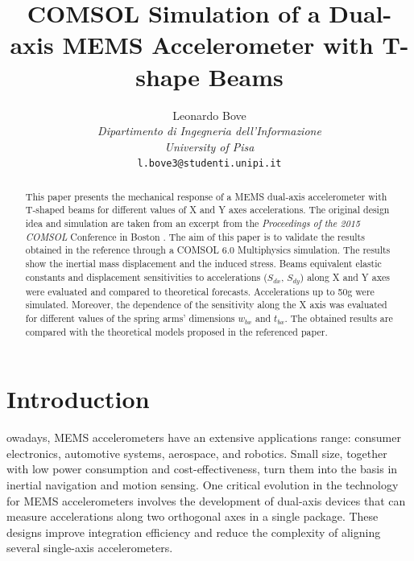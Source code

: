 \documentclass[lettersize,journal]{IEEEtran}
\begin{document}
	
    \title{COMSOL Simulation of a Dual-axis MEMS Accelerometer with T-shape Beams}

    \author{Leonardo Bove\\
            \textit{Dipartimento di Ingegneria dell'Informazione}\\
            \textit{University of Pisa}\\
            \texttt{l.bove3@studenti.unipi.it}}

    \maketitle
	
    \begin{abstract}
        This paper presents the mechanical response of a MEMS dual-axis accelerometer with T-shaped beams for different values of X and Y axes accelerations. The original design idea and simulation are taken from an excerpt from the \textit{Proceedings of the 2015 COMSOL} Conference in Boston \cite{original}. The aim of this paper is to validate the results obtained in the reference through a COMSOL 6.0 Multiphysics simulation. The results show the inertial mass displacement and the induced stress. Beams equivalent elastic constants and displacement sensitivities to accelerations (\(S_{dx}\), \(S_{dy}\)) along X and Y axes were evaluated and compared to theoretical forecasts. Accelerations up to 50g were simulated. Moreover, the dependence of the  sensitivity along the X axis was evaluated for different values of the spring arms' dimensions \(w_{bx}\) and \(t_{bx}\). The obtained results are compared with the theoretical models proposed in the referenced paper.
    \end{abstract}
	
    \section{Introduction}
        owadays, MEMS accelerometers have an extensive applications range: consumer electronics, automotive systems, aerospace, and robotics. Small size, together with low power consumption and cost-effectiveness, turn them into the basis in inertial navigation and motion sensing. One critical evolution in the technology for MEMS accelerometers involves the development of dual-axis devices that can measure accelerations along two orthogonal axes in a single package. These designs improve integration efficiency and reduce the complexity of aligning several single-axis accelerometers.
        
\end{document}
